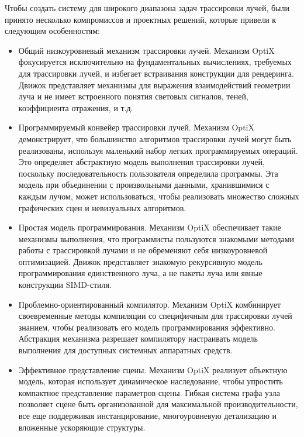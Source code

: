 Чтобы создать систему для широкого диапазона задач трассировки лучей, были принято несколько компромиссов и проектных решений, которые привели к следующим особенностям:
\begin{itemize}
 \item Общий низкоуровневый механизм трассировки лучей. 
 Механизм OptiX фокусируется исключительно на фундаментальных вычислениях, требуемых для трассировки лучей, и избегает встраивания конструкции для рендеринга. 
 Движок представляет механизмы для выражения взаимодействий геометрии луча и не имеет встроенного понятия световых сигналов, теней, коэффициента отражения, и т.д.

\item Программируемый конвейер трассировки лучей. 
Механизм OptiX демонстрирует, что большинство алгоритмов трассировки лучей могут быть реализованы, используя маленький набор легких программируемых операций. 
Это определяет абстрактную модель выполнения трассировки лучей, поскольку последовательность пользователя определила программы. 
Эта модель при объединении с произвольными данными, хранившимися с каждым лучом, может использоваться, чтобы реализовать множество сложных графических сцен и невизуальных алгоритмов.

\item Простая модель программирования. 
Механизм OptiX обеспечивает такие механизмы выполнения, что программисты пользуются знакомыми методами работы с трассировкой лучами и  не обременяют себя низкоуровневой оптимизацией. 
Движок представляет знакомую рекурсивную модель программирования единственного луча, а не пакеты луча или явные конструкции SIMD-стиля. 

\item Проблемно-ориентированный компилятор. 
Механизм OptiX комбинирует своевременные методы компиляции со специфичным для трассировки лучей знанием, чтобы реализовать его модель программирования эффективно. 
Абстракция механизма разрешает компилятору настраивать модель выполнения для доступных системных аппаратных средств.

\item Эффективное представление сцены. 
Механизм OptiX реализует объектную модель, которая использует динамическое наследование, чтобы упростить компактное представление параметров сцены. 
Гибкая система графа узла позволяет сцене быть организованной для максимальной производительности, все еще поддерживая инстанцирование, многоуровневую детализацию и вложенные ускоряющие структуры.

\end{itemize}


